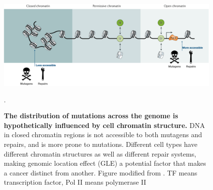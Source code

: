 \begin{figure}[h!]
    \centering
    \includegraphics[scale=0.24]{graphics/chromatin_demo.png}
    \caption{\textbf{The distribution of mutations across the genome is hypothetically influenced by cell chromatin structure.} DNA in closed chromatin regions is not accessible to both mutagens and repairs, and is more prone to mutations. Different cell types have different chromatin structures as well as different repair systems, making genomic location effect (GLE) a potential factor that makes a cancer distinct from another. Figure modified from \citet{Klemm2019ChromatinEpigenome}. TF means transcription factor, Pol II means polymerase II}.
    \label{fig:chromatin_demo}
\end{figure}
